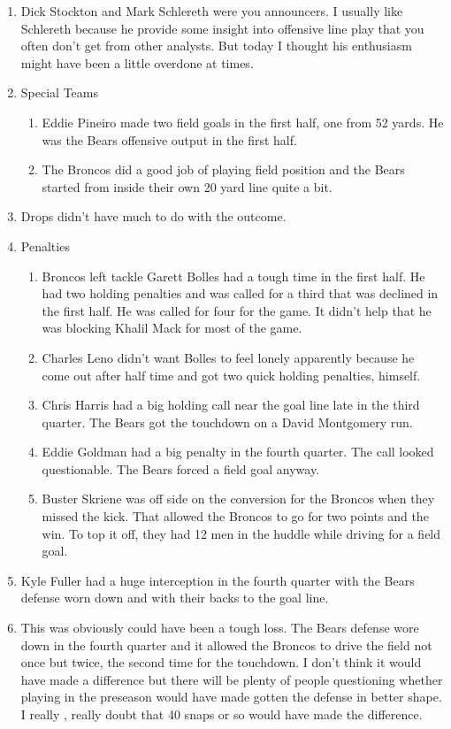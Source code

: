 \documentclass[11pt]{article}
\begin{document}
  \begin{enumerate}
  \item Dick Stockton and Mark Schlereth were you announcers.  I usually like Schlereth because he provide some insight into offensive line play that you often don't get from other analysts.  But today I thought his enthusiasm might have been a little overdone at times.
  \item  Special Teams
    \begin{enumerate}
    \item Eddie Pineiro made two field goals in the first half, one from 52 yards.  He was the Bears offensive output in the first half.
    \item The Broncos did a good job of playing field position and the Bears started from inside their own 20 yard line quite a bit.
  \end{enumerate}
  \item Drops didn't have much to do with the outcome.
  \item Penalties
    \begin{enumerate}
    \item Broncos left tackle Garett Bolles had a tough time in the
      first half.  He had two holding penalties and was called for a
      third that was declined in the first half.  He was called for
      four for the game.  It didn't help that he was blocking Khalil Mack for most of the game.
    \item Charles Leno didn't want Bolles to feel
      lonely apparently because he come out after half time and got
      two quick holding penalties, himself.  
    \item Chris Harris had a big
      holding call near the goal line late in the third quarter.  The
      Bears got the touchdown on a David Montgomery run.  
    \item Eddie
      Goldman had a big penalty in the fourth quarter.  The call
      looked questionable.  The Bears forced a field goal anyway.
    \item Buster Skriene was off side on the conversion for the Broncos when they missed the kick.  That allowed the Broncos to go for two points and the win.  To top it off, they had 12 men in the huddle while driving for a field goal.
  \end{enumerate}

  \item Kyle Fuller had a huge interception in the fourth quarter with the Bears defense worn down and with their backs to the goal line.
  \item This was obviously could have been a tough loss.  The Bears defense wore down in the fourth quarter and it allowed the Broncos to drive the field not once but twice, the second time for the touchdown.  I don't think it would have made a difference but there will be plenty of people questioning whether playing in the preseason would have made gotten the defense in better shape.  I really , really doubt that 40 snaps or so would have made the difference.


\end{enumerate}
\end{document}
